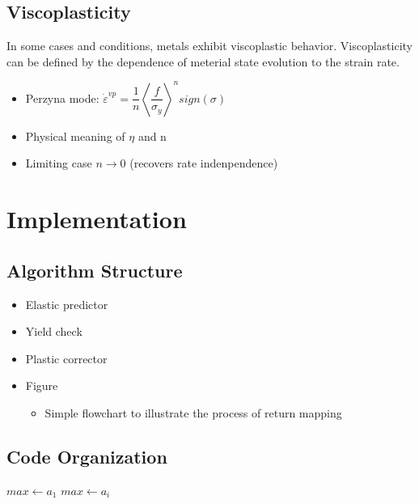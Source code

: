 \documentclass[preprint,12pt]{elsarticle}
\begin{document}
\subsection{Viscoplasticity}
\label{Viscoplasticity}
In some cases and conditions, metals exhibit viscoplastic behavior. Viscoplasticity can be defined by the dependence of meterial state evolution to the strain rate. 
\begin{itemize}
  \item Perzyna mode: $\dot{\varepsilon}^{vp}= \dfrac{1}{n} \left\langle  \dfrac{f}{\sigma_{y}} \right\rangle^{n} sign(\sigma)$
  \item Physical meaning of $\eta$ and n
  \item Limiting case $n \rightarrow 0$ (recovers rate indenpendence)
\end{itemize}

\section{Implementation}
\label{Implementation}

\subsection{Algorithm Structure}
\label{Algorithm Structure}
\begin{itemize}
  \item Elastic predictor
  \item Yield check
  \item Plastic corrector
  \item Figure
  \begin{itemize}
    \item Simple flowchart to illustrate the process of return mapping
  \end{itemize}
\end{itemize}

\subsection{Code Organization}
\label{Code Organization}

\begin{algorithm}
\DontPrintSemicolon %
$max \gets a_1$\;
 {
   {
    $max \gets a_i$\;
  }
}
\;
\caption{{\sc Max} finds the maximum number}\label{alg:one}
\label{algo:max}
\end{algorithm}
\end{document}
